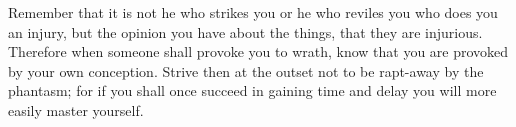 Remember that it is  not he who strikes you or he who  reviles you who does you
an injury, but the opinion you have  about the things, that they are injurious.
Therefore when someone  shall provoke you to wrath, know  that you are provoked
by your own  conception. Strive then at  the outset not to be  rapt-away by the
phantasm; for if you shall once succeed in gaining time and delay you will more
easily master yourself.
